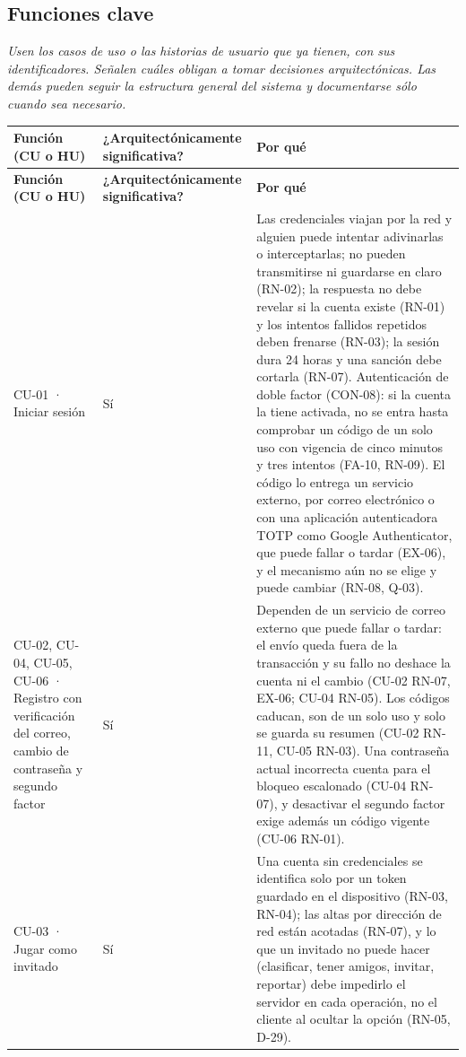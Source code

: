 \documentclass[11pt,letterpaper]{article}
\newcommand{\hint}[1]{{\itshape\color{black!70}#1}\par} %
\newcommand{\hd}[1]{\textbf{\small #1}}
\newcommand{\headrow}{\rowcolor{SADHead}}
\begin{document}
\subsection{Funciones clave}
\hint{Usen los casos de uso o las historias de usuario que ya tienen, con sus identificadores. Señalen cuáles obligan a tomar decisiones arquitectónicas. Las demás pueden seguir la estructura general del sistema y documentarse sólo cuando sea necesario.}
\begin{xltabular}{\linewidth}{|p{4.6cm}|p{3.2cm}|Y|}\hline
  \headrow\hd{Función (CU o HU)} & \hd{¿Arquitectónica\-mente significativa?} & \hd{Por qué}\\\hline
  \endfirsthead
  \headrow\hd{Función (CU o HU)} & \hd{¿Arquitectónica\-mente significativa?} & \hd{Por qué}\\\hline
  \endhead
  CU-01 · Iniciar sesión & Sí & Las credenciales viajan por la red y alguien puede intentar adivinarlas o interceptarlas; no pueden transmitirse ni guardarse en claro (RN-02); la respuesta no debe revelar si la cuenta existe (RN-01) y los intentos fallidos repetidos deben frenarse (RN-03); la sesión dura 24 horas y una sanción debe cortarla (RN-07). Autenticación de doble factor (CON-08): si la cuenta la tiene activada, no se entra hasta comprobar un código de un solo uso con vigencia de cinco minutos y tres intentos (FA-10, RN-09). El código lo entrega un servicio externo, por correo electrónico o con una aplicación autenticadora TOTP como Google Authenticator, que puede fallar o tardar (EX-06), y el mecanismo aún no se elige y puede cambiar (RN-08, Q-03).\\\hline
  CU-02, CU-04, CU-05, CU-06 · Registro con verificación del correo, cambio de contraseña y segundo factor & Sí & Dependen de un servicio de correo externo que puede fallar o tardar: el envío queda fuera de la transacción y su fallo no deshace la cuenta ni el cambio (CU-02 RN-07, EX-06; CU-04 RN-05). Los códigos caducan, son de un solo uso y solo se guarda su resumen (CU-02 RN-11, CU-05 RN-03). Una contraseña actual incorrecta cuenta para el bloqueo escalonado (CU-04 RN-07), y desactivar el segundo factor exige además un código vigente (CU-06 RN-01).\\\hline
  CU-03 · Jugar como invitado & Sí & Una cuenta sin credenciales se identifica solo por un token guardado en el dispositivo (RN-03, RN-04); las altas por dirección de red están acotadas (RN-07), y lo que un invitado no puede hacer (clasificar, tener amigos, invitar, reportar) debe impedirlo el servidor en cada operación, no el cliente al ocultar la opción (RN-05, D-29).\\\hline

\end{xltabular}
\end{document}
